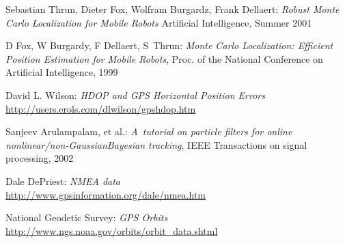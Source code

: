 \clearpage
{}
\begin{thebibliography}{99}

Sebastian Thrun, Dieter Fox, Wolfram Burgardz, Frank Dellaert:
\emph{Robust Monte Carlo Localization for Mobile Robots}
Artificial Intelligence, Summer 2001

D Fox, W Burgardy, F Dellaert, S~Thrun:
{\em Monte Carlo Localization: Efficient Position Estimation for Mobile Robots},
Proc. of the National Conference on Artificial Intelligence, 1999

David L. Wilson:
\emph{HDOP and GPS Horizontal Position Errors} \\
\url{http://users.erols.com/dlwilson/gpshdop.htm}

Sanjeev Arulampalam, et al.:
{\em A~tutorial on particle filters for online nonlinear/non-GaussianBayesian tracking},
IEEE Transactions on signal processing, 2002

Dale DePriest:
\emph{NMEA data} \\
\url{http://www.gpsinformation.org/dale/nmea.htm}

National Geodetic Survey:
\emph{GPS Orbits} \\
\url{http://www.ngs.noaa.gov/orbits/orbit_data.shtml}

\end{thebibliography}

